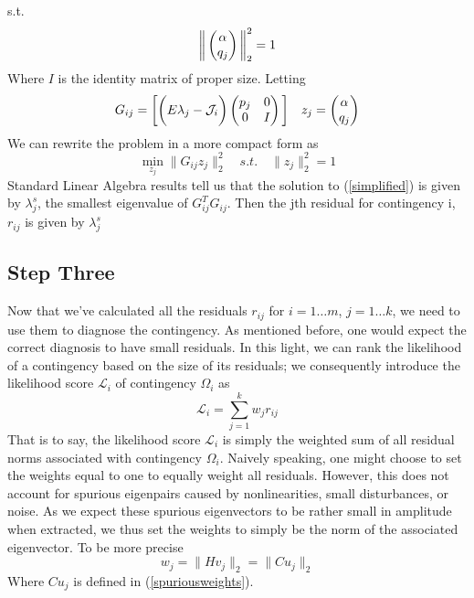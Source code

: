 s.t.
\begin{equation}
        \bigg{ \| } 
    \begin{pmatrix}
        \alpha \\
        q_j
    \end{pmatrix}
     \bigg{ \| }_2^2 = 1
\end{equation}
Where $I$ is the identity matrix of proper size. Letting
\begin{equation}
        G_{ij} = 
    \bigg{[}
    \bigg{(}E {\lambda_j} - \mathcal{J}_i\bigg{)}
    \begin{pmatrix}
        p_j & 0 \\
        0 & I
    \end{pmatrix}
    \bigg{]}
    \quad 
    z_j = 
    \begin{pmatrix}
        \alpha \\
        q_j
    \end{pmatrix}
\end{equation}
We can rewrite the problem in a more compact form as 
\begin{equation}\label{simplified}
        \min_{z_j} \| G_{ij}z_j\|_2^2 \quad s.t. \quad \|z_j\|_2^2 = 1
\end{equation}
Standard Linear Algebra results tell us that the solution to (\ref{simplified}) is given by $\lambda_j^s$, the smallest eigenvalue of $G_{ij}^TG_{ij}$. Then the jth residual for contingency i, $r_{ij}$ is given by $\lambda_j^s$
\subsection{Step Three}
Now that we've calculated all the residuals $r_{ij}$ for $i = 1 \dots m$, $j = 1 \dots k$, we need to use them to diagnose the contingency. As mentioned before, one would expect the correct diagnosis to have small residuals. In this light, we can rank the likelihood of a contingency based on the size of its residuals; we consequently introduce the likelihood score $\mathcal{L}_i$ of contingency $\Omega_i$ as
\begin{equation}
    \mathcal{L}_i = \sum_{j=1}^k w_j r_{ij}
\end{equation}
That is to say, the likelihood score $\mathcal{L}_i$ is simply the weighted sum of all residual norms associated with contingency $\Omega_i$. Naively speaking, one might choose to set the weights equal to one to equally weight all residuals. However, this does not account for spurious eigenpairs caused by nonlinearities, small disturbances, or noise. As we expect these spurious eigenvectors to be rather small in amplitude when extracted, we thus set the weights to simply be the norm of the associated eigenvector. To be more precise
\begin{equation}
    w_j = \| Hv_j \|_2 = \|Cu_j\|_2 
\end{equation}
Where $Cu_j$ is defined in (\ref{spuriousweights}). 

